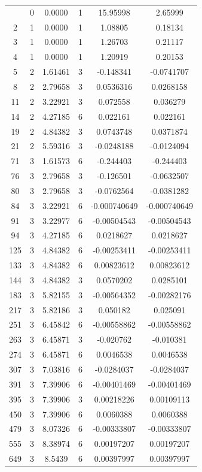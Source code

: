 \documentclass[11pt]{article}
\begin{document}
\begin{longtable} {c c c c c c}
\bottomrule
\endlastfoot
1&	0&	0.0000 &	1&	15.95998&	2.65999\\
2&	1&	0.0000&	        1&	1.08805 &	0.18134\\
3&	1&	0.0000& 	1&	1.26703	 &       0.21117\\
4&	1&	0.0000& 	1&	1.20919 &	0.20153\\
5&	2&	1.61461&	3&	-0.148341&	-0.0741707\\
8&	2&	2.79658&	3&	0.0536316&	0.0268158\\
11&	2&	3.22921&	3&	0.072558&	0.036279\\
14&	2&	4.27185&	6&	0.022161&	0.022161\\
19&	2&	4.84382&	3&	0.0743748&	0.0371874\\
21&	2&	5.59316&	3&	-0.0248188&	-0.0124094\\
71&	3&	1.61573&	6&	-0.244403&	-0.244403\\
76&	3&	2.79658&	3&	-0.126501&	-0.0632507\\
80&	3&	2.79658&	3&	-0.0762564&	-0.0381282\\
84&	3&	3.22921&	6&	-0.000740649&	-0.000740649\\
91&	3&	3.22977&	6&	-0.00504543&	-0.00504543\\
94&	3&	4.27185&	6&	0.0218627&	0.0218627\\
125&	3&	4.84382&	6&	-0.00253411&	-0.00253411\\
133&	3&	4.84382&	6&	0.00823612&	0.00823612\\
144&	3&	4.84382&	3&	0.0570202&	0.0285101\\
183&	3&	5.82155&	3&	-0.00564352&	-0.00282176\\
217&	3&	5.82186&	3&	0.050182&	0.025091\\
251&	3&	6.45842&	6&	-0.00558862&	-0.00558862\\
263&	3&	6.45871&	3&	-0.020762&	-0.010381\\
274&	3&	6.45871&	6&	0.0046538&	0.0046538\\
307&	3&	7.03816&	6&	-0.0284037&	-0.0284037\\
391&	3&	7.39906&	6&	-0.00401469&	-0.00401469\\
395&	3&	7.39906&	3&	0.00218226&	0.00109113\\
450&	3&	7.39906&	6&	0.0060388&	0.0060388\\
479&	3&	8.07326&	6&	-0.00333807&	-0.00333807\\
555&	3&	8.38974&	6&	0.00197207&	0.00197207\\
649&	3&	8.5439& 	6&	0.00397997&	0.00397997\\

\end{longtable}
\end{document}
